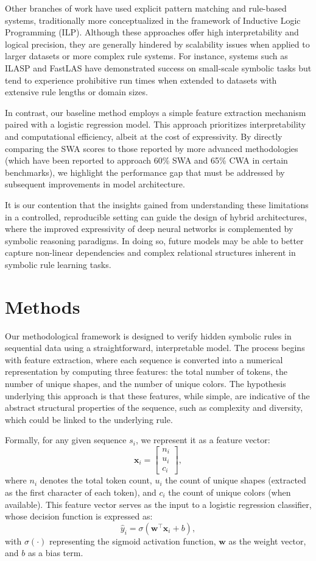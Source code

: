 \documentclass{article}
\begin{document}
Other branches of work have used explicit pattern matching and rule-based systems, traditionally more conceptualized in the framework of Inductive Logic Programming (ILP). Although these approaches offer high interpretability and logical precision, they are generally hindered by scalability issues when applied to larger datasets or more complex rule systems. For instance, systems such as ILASP and FastLAS have demonstrated success on small-scale symbolic tasks but tend to experience prohibitive run times when extended to datasets with extensive rule lengths or domain sizes.

In contrast, our baseline method employs a simple feature extraction mechanism paired with a logistic regression model. This approach prioritizes interpretability and computational efficiency, albeit at the cost of expressivity. By directly comparing the SWA scores to those reported by more advanced methodologies (which have been reported to approach 60\% SWA and 65\% CWA in certain benchmarks), we highlight the performance gap that must be addressed by subsequent improvements in model architecture.

It is our contention that the insights gained from understanding these limitations in a controlled, reproducible setting can guide the design of hybrid architectures, where the improved expressivity of deep neural networks is complemented by symbolic reasoning paradigms. In doing so, future models may be able to better capture non-linear dependencies and complex relational structures inherent in symbolic rule learning tasks.

\section{Methods}
Our methodological framework is designed to verify hidden symbolic rules in sequential data using a straightforward, interpretable model. The process begins with feature extraction, where each sequence is converted into a numerical representation by computing three features: the total number of tokens, the number of unique shapes, and the number of unique colors. The hypothesis underlying this approach is that these features, while simple, are indicative of the abstract structural properties of the sequence, such as complexity and diversity, which could be linked to the underlying rule.

Formally, for any given sequence \( s_i \), we represent it as a feature vector:
\[
\mathbf{x}_i = \begin{bmatrix} n_i \\ u_i \\ c_i \end{bmatrix},
\]
where \( n_i \) denotes the total token count, \( u_i \) the count of unique shapes (extracted as the first character of each token), and \( c_i \) the count of unique colors (when available). This feature vector serves as the input to a logistic regression classifier, whose decision function is expressed as:
\[
\hat{y}_i = \sigma\left(\mathbf{w}^\top \mathbf{x}_i + b\right),
\]
with \(\sigma(\cdot)\) representing the sigmoid activation function, \(\mathbf{w}\) as the weight vector, and \(b\) as a bias term.
\end{document}

